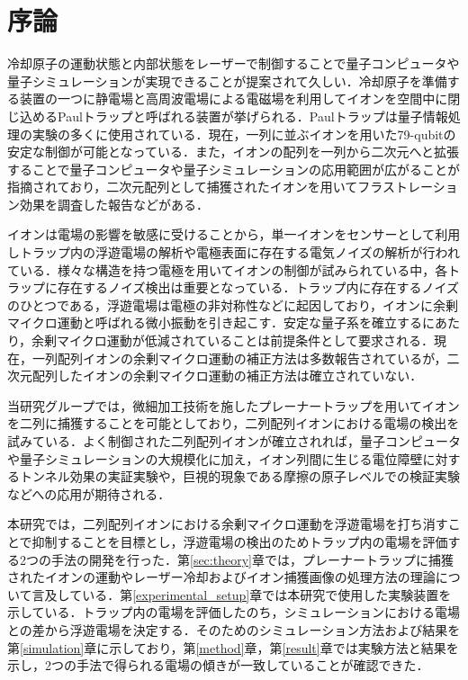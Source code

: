 \chapter{序論}
冷却原子の運動状態と内部状態をレーザーで制御することで量子コンピュータや量子シミュレーションが実現できることが提案されて久しい\cite{Cirac_1995}．冷却原子を準備する装置の一つに静電場と高周波電場による電磁場を利用してイオンを空間中に閉じ込めるPaulトラップと呼ばれる装置が挙げられる．Paulトラップは量子情報処理の実験の多くに使用されている．現在，一列に並ぶイオンを用いた79-qubitの安定な制御が可能となっている\cite{Wright_2019}．また，イオンの配列を一列から二次元へと拡張することで量子コンピュータや量子シミュレーションの応用範囲が広がることが指摘されており\cite{Cirac_2000}，二次元配列として捕獲されたイオンを用いてフラストレーション効果を調査した報告などがある\cite{Mielenz_2016}．

イオンは電場の影響を敏感に受けることから，単一イオンをセンサーとして利用しトラップ内の浮遊電場の解析\cite{Narayanan_2011}や電極表面に存在する電気ノイズの解析\cite{Danii_2014}が行われている．様々な構造を持つ電極を用いてイオンの制御が試みられている中，各トラップに存在するノイズ検出は重要となっている．トラップ内に存在するノイズのひとつである，浮遊電場は電極の非対称性などに起因しており，イオンに余剰マイクロ運動と呼ばれる微小振動を引き起こす．安定な量子系を確立するにあたり，余剰マイクロ運動が低減されていることは前提条件として要求される．現在，一列配列イオンの余剰マイクロ運動の補正方法は多数報告されているが\cite{Berkeland_1998}\cite{Chen_2020}\cite{Timm_2015}，二次元配列したイオンの余剰マイクロ運動の補正方法は確立されていない．

当研究グループでは，微細加工技術を施したプレーナートラップを用いてイオンを二列に捕獲することを可能としており\cite{Tanaka_2021}，二列配列イオンにおける電場の検出を試みている．よく制御された二列配列イオンが確立されれば，量子コンピュータや量子シミュレーションの大規模化に加え，イオン列間に生じる電位障壁に対するトンネル効果の実証実験や，巨視的現象である摩擦の原子レベルでの検証実験などへの応用が期待される\cite{Tanaka_2021}\cite{L-Timm_2021}．

本研究では，二列配列イオンにおける余剰マイクロ運動を浮遊電場を打ち消すことで抑制することを目標とし，浮遊電場の検出のためトラップ内の電場を評価する2つの手法の開発を行った．第\ref{sec:theory}章では，プレーナートラップに捕獲されたイオンの運動やレーザー冷却およびイオン捕獲画像の処理方法の理論について言及している．第\ref{experimental_setup}章では本研究で使用した実験装置を示している．トラップ内の電場を評価したのち，シミュレーションにおける電場との差から浮遊電場を決定する．そのためのシミュレーション方法および結果を第\ref{simulation}章に示しており，第\ref{method}章，第\ref{result}章では実験方法と結果を示し，2つの手法で得られる電場の傾きが一致していることが確認できた．